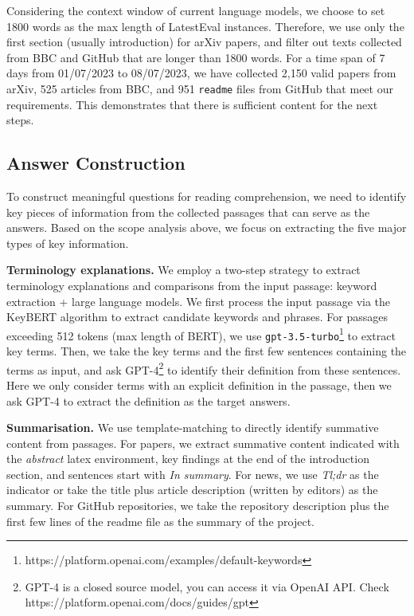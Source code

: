 \documentclass[letterpaper]{article} %
\begin{document}
Considering the context window of current language models, we choose to set 1800 words as the max length of LatestEval instances. Therefore, we use only the first section (usually introduction) for arXiv papers, and filter out texts collected from BBC and GitHub that are longer than 1800 words. For a time span of 7 days from 01/07/2023 to 08/07/2023, 
we have collected 2,150 valid papers from arXiv, 525 articles from BBC, and 951 \texttt{readme} files from GitHub that meet our requirements. This demonstrates that there is sufficient content for the next steps. 

\subsection{Answer Construction}

To construct meaningful questions for reading comprehension, we need to identify key pieces of information from the collected passages that can serve as the answers. Based on the scope analysis above, we focus on extracting the five major types of key information.

\noindent\textbf{Terminology explanations.} We employ a two-step strategy to extract terminology explanations and comparisons from the input passage: keyword extraction + large language models. We first process the input passage via the KeyBERT \cite{grootendorst2020keybert} algorithm to extract candidate keywords and phrases. For passages exceeding 512 tokens (max length of BERT), we use \texttt{gpt-3.5-turbo}\footnote{https://platform.openai.com/examples/default-keywords} to extract key terms. Then, we take the key terms and the first few sentences containing the terms as input, and ask GPT-4\footnote{GPT-4 is a closed source model, you can access it via OpenAI API. Check https://platform.openai.com/docs/guides/gpt} to identify their definition from these sentences. Here we only consider terms with an explicit definition in the passage, then we ask GPT-4 to extract the definition as the target answers.

\noindent\textbf{Summarisation.} We use template-matching to directly identify summative content from passages. For papers, we extract summative content indicated with the \textit{abstract} latex environment, key findings at the end of the introduction section, and sentences start with \textit{In summary}. For news, we use \textit{Tl;dr} as the indicator or take the title plus article description (written by editors) as the summary. For GitHub repositories, we take the repository description plus the first few lines of the readme file as the summary of the project.
\end{document}
